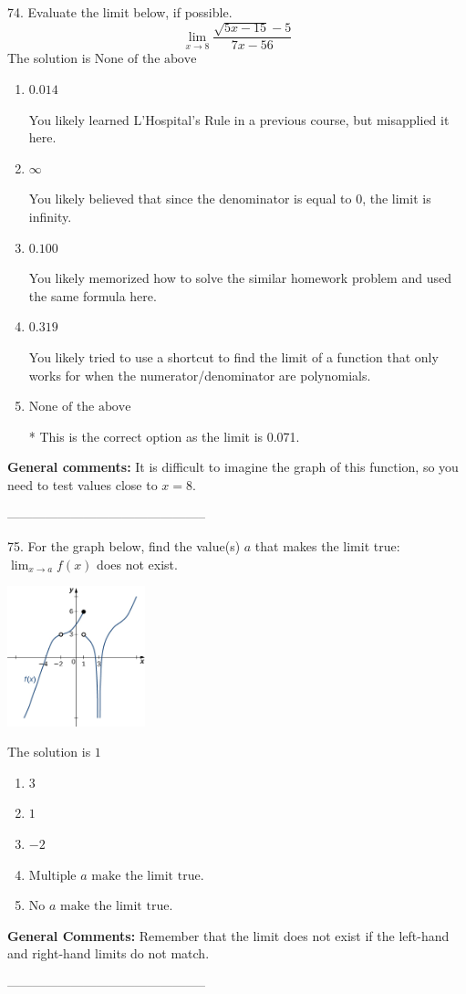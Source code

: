 \documentclass{extbook}[14pt]
\begin{document}
74. Evaluate the limit below, if possible.
\[ \lim_{x \rightarrow 8} \frac{\sqrt{5x - 15} - 5}{7x - 56} \] 
The solution is $ \text{None of the above} $ 

\begin{enumerate}[label=\Alph*.] 
\item $ 0.014 $ 

 You likely learned L'Hospital's Rule in a previous course, but misapplied it here. 
\item $ \infty $ 

 You likely believed that since the denominator is equal to 0, the limit is infinity. 
\item $ 0.100 $ 

 You likely memorized how to solve the similar homework problem and used the same formula here. 
\item $ 0.319 $ 

 You likely tried to use a shortcut to find the limit of a function that only works for when the numerator/denominator are polynomials. 
\item $ \text{None of the above} $ 

 * This is the correct option as the limit is 0.071. 
\end{enumerate} 
 
\textbf{General comments:} It is difficult to imagine the graph of this function, so you need to test values close to $x = 8$.

-----------------------------------------------

75. For the graph below, find the value(s) $a$ that makes the limit true: $ \displaystyle \lim_{x \rightarrow a} f(x)$ does not exist.
\begin{center} \includegraphics[width=0.3\textwidth]{../Figures/evaluateLimitGraphicallyC.png} \end{center} 

The solution is $ 1 $ 

\begin{enumerate}[label=\Alph*.] 
\item $ 3 $ 

  
\item $ 1 $ 

  
\item $ -2 $ 

  
\item $ \text{Multiple } a \text{ make the limit true}. $ 

  
\item $ \text{No } a \text{ make the limit true}. $ 

  
\end{enumerate} 
 
\textbf{General Comments:} Remember that the limit does not exist if the left-hand and right-hand limits do not match.

-----------------------------------------------
\end{document}
